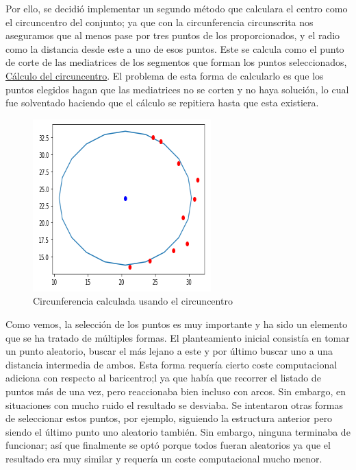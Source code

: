 \documentclass[conference,a4paper]{IEEEtran}
\begin{document}
Por ello, se decidió implementar un segundo método que calculara el centro como el circuncentro del conjunto; ya que con la circunferencia circunscrita nos aseguramos que al menos pase por tres puntos de los proporcionados, y el radio como la distancia desde este a uno de esos puntos. Este se calcula como el punto de corte de las mediatrices de los segmentos que forman los puntos seleccionados, \hyperref[bib:georgeSeif]{Cálculo del circuncentro}. El problema de esta forma de calcularlo es que los puntos elegidos hagan que las mediatrices no se corten y no haya solución, lo cual fue solventado haciendo que el cálculo se repitiera hasta que esta existiera.\\

\newpage
\begin{figure}[h]
\centering
\includegraphics[scale=0.8]{ArcoCircuncentroResultado}
\caption{Circunferencia calculada usando el circuncentro}
\end{figure}

Como vemos, la selección de los puntos es muy importante y ha sido un elemento que se ha tratado de múltiples formas. El planteamiento inicial  consistía en tomar un punto aleatorio, buscar el más lejano a este y por último buscar uno a una distancia intermedia de ambos. Esta forma requería cierto coste computacional adiciona con respecto al baricentro;l ya que había que recorrer el listado de puntos más de una vez, pero reaccionaba bien incluso con arcos. Sin embargo, en situaciones con mucho ruido el resultado se desviaba. Se intentaron otras formas de seleccionar estos puntos, por ejemplo, siguiendo la estructura anterior pero siendo el último punto uno aleatorio también. Sin embargo, ninguna terminaba de funcionar; así que finalmente se optó porque todos fueran aleatorios ya que el resultado era muy similar y requería un coste computacional mucho menor.\\
\end{document}

